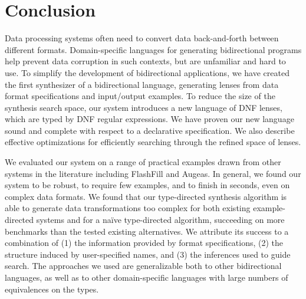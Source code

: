 \documentclass[acmsmall]{acmart}
\begin{document}



\section{Conclusion}
\label{sec:conc}

Data processing systems often need to convert data back-and-forth
between different formats.  Domain-specific languages for generating
bidirectional programs help prevent data corruption in such contexts,
but are unfamiliar and hard to use.  To simplify the development of
bidirectional applications, we have created the first synthesizer of a
bidirectional language, generating
lenses from data format specifications and input/output examples.
To reduce the size of the synthesis search space, our system introduces
a new language of DNF lenses, which are typed by DNF regular expressions.
We have proven our new language sound and complete with respect to
a declarative specification.  We also describe effective optimizations
for efficiently searching through the refined space of lenses.

We evaluated our system on a range of practical examples drawn from
other systems in the literature including FlashFill and Augeas.  In
general, we found our system to be robust, to require few examples,
and to finish in seconds, even on complex data formats.  We found that our
type-directed synthesis algorithm is able to generate data
transformations too complex for both existing example-directed systems and for a
na\"{i}ve type-directed algorithm, succeeding on  more benchmarks than
the tested existing alternatives.
We attribute its success to a combination of (1) the information provided
by format specifications, (2) the structure induced by user-specified
names, and (3) the inferences used to guide search.
The approaches we used are generalizable both to other bidirectional languages,
as well as to other domain-specific languages with large numbers of equivalences
on the types.
\end{document}
